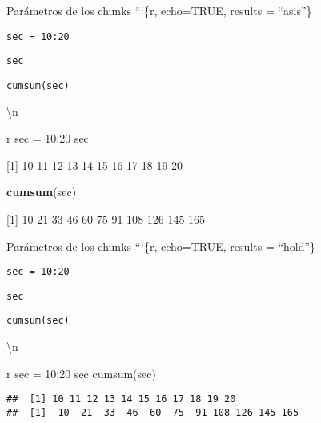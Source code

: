 \documentclass[
  ignorenonframetext,
]{beamer}
\newenvironment{Shaded}{\begin{snugshade}}{\end{snugshade}}
\newcommand{\FunctionTok}[1]{\textcolor[rgb]{0.13,0.29,0.53}{\textbf{#1}}}
\newcommand{\NormalTok}[1]{#1}
\begin{document}
\begin{frame}[fragile]{Parámetros de los chunks}
\protect\hypertarget{paruxe1metros-de-los-chunks-4}{}
```\{r, echo=TRUE, results = ``asis''\}

\texttt{sec\ =\ 10:20}

\texttt{sec}

\texttt{cumsum(sec)}

\begin{Shaded}
\begin{Highlighting}[]

\NormalTok{\textbackslash{}n}


\NormalTok{\textasciigrave{}\textasciigrave{}\textasciigrave{}r}
\NormalTok{sec = 10:20}
\NormalTok{sec}
\end{Highlighting}
\end{Shaded}

{[}1{]} 10 11 12 13 14 15 16 17 18 19 20

\begin{Shaded}
\begin{Highlighting}[]
\FunctionTok{cumsum}\NormalTok{(sec)}
\end{Highlighting}
\end{Shaded}

{[}1{]} 10 21 33 46 60 75 91 108 126 145 165
\end{frame}

\begin{frame}[fragile]{Parámetros de los chunks}
\protect\hypertarget{paruxe1metros-de-los-chunks-5}{}
```\{r, echo=TRUE, results = ``hold''\}

\texttt{sec\ =\ 10:20}

\texttt{sec}

\texttt{cumsum(sec)}

\begin{Shaded}
\begin{Highlighting}[]

\NormalTok{\textbackslash{}n}


\NormalTok{\textasciigrave{}\textasciigrave{}\textasciigrave{}r}
\NormalTok{sec = 10:20}
\NormalTok{sec}
\NormalTok{cumsum(sec)}
\end{Highlighting}
\end{Shaded}

\begin{verbatim}
##  [1] 10 11 12 13 14 15 16 17 18 19 20
##  [1]  10  21  33  46  60  75  91 108 126 145 165
\end{verbatim}
\end{frame}
\end{document}

